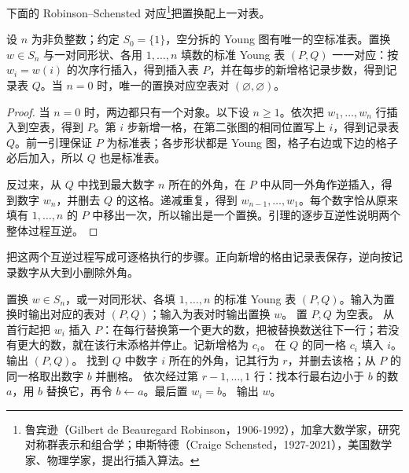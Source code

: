 下面的 Robinson--Schensted 对应\footnote{鲁宾逊（Gilbert de Beauregard Robinson，1906-1992），加拿大数学家，研究对称群表示和组合学；申斯特德（Craige Schensted，1927-2021），美国数学家、物理学家，提出行插入算法。}把置换配上一对表。
\begin{theorem}\label{b5:thm:rs-correspondence}
	设 \(n\) 为非负整数；约定 \(S_0=\{1\}\)，空分拆的 Young 图有唯一的空标准表。置换 \(w\in S_n\) 与一对同形状、各用 \(1,\ldots,n\) 填数的标准 Young 表 \((P,Q)\) 一一对应：按 \(w_i=w(i)\) 的次序行插入，得到插入表 \(P\)，并在每步的新增格记录步数，得到记录表 \(Q\)。当 \(n=0\) 时，唯一的置换对应空表对 \((\varnothing,\varnothing)\)。
\end{theorem}
\begin{proof}
	当 \(n=0\) 时，两边都只有一个对象。以下设 \(n\ge1\)。依次把 \(w_1,\ldots,w_n\) 行插入到空表，得到 \(P\)。第 \(i\) 步新增一格，在第二张图的相同位置写上 \(i\)，得到记录表 \(Q\)。前一引理保证 \(P\) 为标准表；各步形状都是 Young 图，格子右边或下边的格子必后加入，所以 \(Q\) 也是标准表。

	反过来，从 \(Q\) 中找到最大数字 \(n\) 所在的外角，在 \(P\) 中从同一外角作逆插入，得到数字 \(w_n\)，并删去 \(Q\) 的这格。递减重复，得到 \(w_{n-1},\ldots,w_1\)。每个数字恰从原来填有 \(1,\ldots,n\) 的 \(P\) 中移出一次，所以输出是一个置换。引理的逐步互逆性说明两个整体过程互逆。
\end{proof}

把这两个互逆过程写成可逐格执行的步骤。正向新增的格由记录表保存，逆向按记录数字从大到小删除外角。

\begin{algorithm}[htbp]
	\caption{Robinson--Schensted 行插入与逆插入}
	\label{b5:alg:robinson-schensted}
	\begin{algorithmsteps}{置换 \(w\in S_n\)，或一对同形状、各填 \(1,\ldots,n\) 的标准 Young 表 \((P,Q)\)。}{输入为置换时输出对应的表对 \((P,Q)\)；输入为表对时输出置换 \(w\)。}
			\State 置 \(P,Q\) 为空表。
				\State 从首行起把 \(w_i\) 插入 \(P\)：在每行替换第一个更大的数，把被替换数送往下一行；若没有更大的数，就在该行末添格并停止。记新增格为 \(c_i\)。
				\State 在 \(Q\) 的同一格 \(c_i\) 填入 \(i\)。
			\EndFor
			\State 输出 \((P,Q)\)。
		\Else
				\State 找到 \(Q\) 中数字 \(i\) 所在的外角，记其行为 \(r\)，并删去该格；从 \(P\) 的同一格取出数字 \(b\) 并删格。
				\State 依次经过第 \(r-1,\ldots,1\) 行：找本行最右边小于 \(b\) 的数 \(a\)，用 \(b\) 替换它，再令 \(b\leftarrow a\)。最后置 \(w_i=b\)。
			\EndFor
			\State 输出 \(w\)。
		\EndIf
	\end{algorithmsteps}
\end{algorithm}

